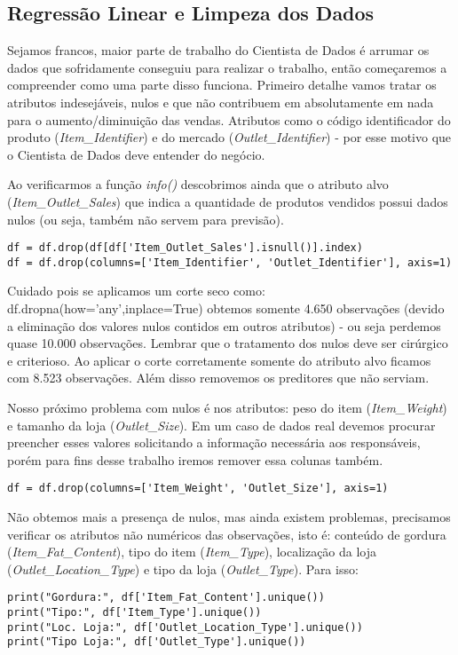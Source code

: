 \subsection{Regressão Linear e Limpeza dos Dados}
Sejamos francos, maior parte de trabalho do Cientista de Dados é arrumar os dados que sofridamente conseguiu para realizar o trabalho, então começaremos a compreender como uma parte disso funciona. Primeiro detalhe vamos tratar os atributos indesejáveis, nulos e que não contribuem em absolutamente em nada para o aumento/diminuição das vendas. Atributos como o código identificador do produto (\textit{Item\_Identifier}) e do mercado (\textit{Outlet\_Identifier}) - por esse motivo que o Cientista de Dados deve entender do negócio.

Ao verificarmos a função \textit{info()} descobrimos ainda que o atributo alvo (\textit{Item\_Outlet\_Sales}) que indica a quantidade de produtos vendidos possui dados nulos (ou seja, também não servem para previsão).
\begin{lstlisting}[]
df = df.drop(df[df['Item_Outlet_Sales'].isnull()].index)
df = df.drop(columns=['Item_Identifier', 'Outlet_Identifier'], axis=1)
\end{lstlisting}

Cuidado pois se aplicamos um corte seco como: {\ttfamily df.dropna(how='any',inplace=True)} obtemos somente 4.650 observações (devido a eliminação dos valores nulos contidos em outros atributos) - ou seja perdemos quase 10.000 observações. Lembrar que o tratamento dos nulos deve ser cirúrgico e criterioso. Ao aplicar o corte corretamente somente do atributo alvo ficamos com 8.523 observações. Além disso removemos os preditores que não serviam.

Nosso próximo problema com nulos é nos atributos: peso do item (\textit{Item\_Weight}) e tamanho da loja (\textit{Outlet\_Size}). Em um caso de dados real devemos procurar preencher esses valores solicitando a informação necessária aos responsáveis, porém para fins desse trabalho iremos remover essa colunas também.
\begin{lstlisting}[]
df = df.drop(columns=['Item_Weight', 'Outlet_Size'], axis=1)
\end{lstlisting}

Não obtemos mais a presença de nulos, mas ainda existem problemas, precisamos verificar os atributos não numéricos das observações, isto é: conteúdo de gordura (\textit{Item\_Fat\_Content}), tipo do item (\textit{Item\_Type}), localização da loja (\textit{Outlet\_Location\_Type}) e tipo da loja (\textit{Outlet\_Type}). Para isso:
\begin{lstlisting}[]
print("Gordura:", df['Item_Fat_Content'].unique())
print("Tipo:", df['Item_Type'].unique())
print("Loc. Loja:", df['Outlet_Location_Type'].unique())
print("Tipo Loja:", df['Outlet_Type'].unique())
\end{lstlisting}

